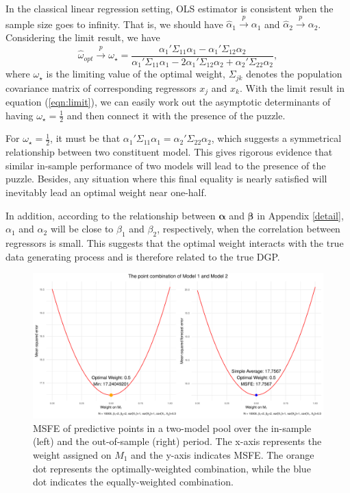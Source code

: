 \documentclass{monashthesis}
\begin{document}
In the classical linear regression setting, OLS estimator is consistent when the sample size goes to infinity. That is, we should have \(\hat\alpha_1 \overset{p}{\to} \alpha_1\) and \(\hat\alpha_2 \overset{p}{\to} \alpha_2\). Considering the limit result, we have
\begin{equation}
\label{eqn:limit}
\hat\omega_{opt} \overset{p}{\to} \omega_\star = \frac{\alpha_1'\Sigma_{11}\alpha_1 - \alpha_1'\Sigma_{12}\alpha_2}{\alpha_1'\Sigma_{11}\alpha_1 - 2\alpha_1'\Sigma_{12}\alpha_2 + \alpha_2'\Sigma_{22}\alpha_2},
\end{equation}
where \(\omega_\star\) is the limiting value of the optimal weight, \(\Sigma_{jk}\) denotes the population covariance matrix of corresponding regressors \(x_j\) and \(x_k\). With the limit result in equation (\ref{eqn:limit}), we can easily work out the asymptotic determinants of having \(\omega_\star=\frac{1}{2}\) and then connect it with the presence of the puzzle.

For \(\omega_\star=\frac{1}{2}\), it must be that \(\alpha_1'\Sigma_{11}\alpha_1 = \alpha_2'\Sigma_{22}\alpha_2\), which suggests a symmetrical relationship between two constituent model. This gives rigorous evidence that similar in-sample performance of two models will lead to the presence of the puzzle. Besides, any situation where this final equality is nearly satisfied will inevitably lead an optimal weight near one-half.

In addition, according to the relationship between \(\pmb \alpha\) and \(\pmb \beta\) in Appendix \ref{detail}, \(\alpha_1\) and \(\alpha_2\) will be close to \(\beta_1\) and \(\beta_2\), respectively, when the correlation between regressors is small. This suggests that the optimal weight interacts with the true data generating process and is therefore related to the true DGP.

\begin{figure}[ht]
\centering
\includegraphics[scale=0.6]{figures/MSFE.pdf}
\caption{MSFE of predictive points in a two-model pool over the in-sample (left) and the out-of-sample (right) period. The x-axis represents the weight assigned on $M_1$ and the y-axis indicates MSFE. The orange dot represents the optimally-weighted combination, while the blue dot indicates the equally-weighted combination.}
\label{fig:msfe}
\end{figure}
\end{document}
